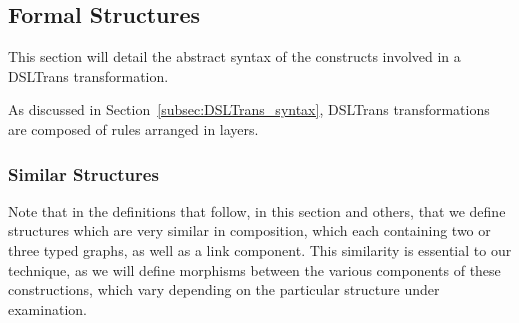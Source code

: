 %
%


\subsection{Formal Structures}
\label{subsec:dsltrans_formal_structures}


This section will detail the abstract syntax of the constructs involved in a DSLTrans transformation.

As discussed in Section~\ref{subsec:DSLTrans_syntax}, DSLTrans transformations are composed of rules arranged in layers.

\subsubsection{Similar Structures}

Note that in the definitions that follow, in this section and others, that we define structures which are very similar in composition, which each containing two or three typed graphs, as well as a link component. This similarity is essential to our technique, as we will define morphisms between the various components of these constructions, which vary depending on the particular structure under examination.

